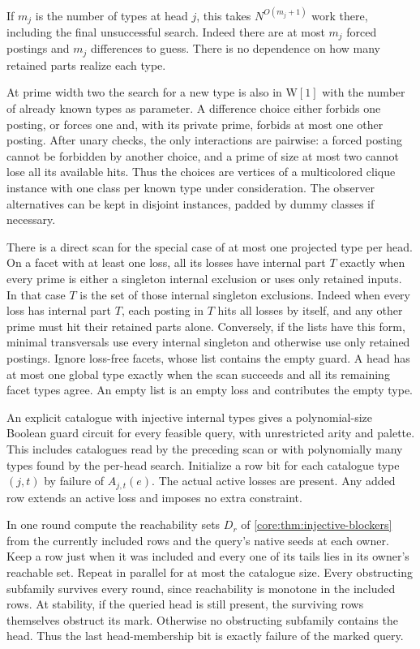If $m_j$ is the number of types at head
$j$, this takes $N^{O(m_j+1)}$ work there,
including the final unsuccessful search.
Indeed there are at most $m_j$ forced
postings and $m_j$ differences to guess.
There is no dependence on how many
retained parts realize each type.

At prime width two the search for a new
type is also in $\mathrm{W}[1]$ with the
number of already known types as parameter.
A difference choice either forbids one
posting, or forces one and, with its
private prime, forbids at most one other
posting. After unary checks, the only
interactions are pairwise: a forced posting
cannot be forbidden by another choice,
and a prime of size at most two cannot
lose all its available hits. Thus the
choices are vertices of a multicolored
clique instance with one class per known
type under consideration. The observer
alternatives can be kept in disjoint
instances, padded by dummy classes if
necessary.

There is a direct scan for the special
case of at most one projected type per
head. On a facet with at least one loss,
all its losses have internal part $T$
exactly when every prime is either a
singleton internal exclusion or uses only
retained inputs. In that case $T$ is
the set of those internal singleton
exclusions. Indeed when every loss has
internal part $T$, each posting in $T$
hits all losses by itself, and any other
prime must hit their retained parts alone.
Conversely, if the lists have this form,
minimal transversals use every internal
singleton and otherwise use only retained
postings. Ignore loss-free facets, whose
list contains the empty guard. A head
has at most one global type exactly when
the scan succeeds and all its remaining
facet types agree. An empty list is an
empty loss and contributes the empty type.

An explicit catalogue with injective
internal types gives a polynomial-size
Boolean guard circuit for every feasible
query, with unrestricted arity and
palette. This includes catalogues read
by the preceding scan or with polynomially
many types found by the per-head search.
Initialize a row bit for each catalogue
type $(j,t)$ by failure of $A_{j,t}(e)$.
The actual active losses are present.
Any added row extends an active loss
and imposes no extra constraint.

In one round compute the reachability
sets $D_r$ of
\cref{core:thm:injective-blockers}
from the currently included rows and the
query's native seeds at each owner.
Keep a row just when it was included
and every one of its tails lies in its
owner's reachable set. Repeat in parallel
for at most the catalogue size. Every
obstructing subfamily survives every
round, since reachability is monotone
in the included rows. At stability, if
the queried head is still present,
the surviving rows themselves obstruct
its mark. Otherwise no obstructing
subfamily contains the head. Thus the
last head-membership bit is exactly
failure of the marked query.

